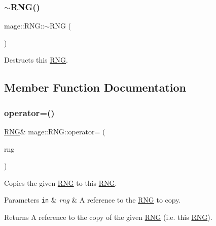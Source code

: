 \subsubsection{\texorpdfstring{$\sim$\+R\+N\+G()}{~RNG()}}
{\footnotesize\ttfamily mage\+::\+R\+N\+G\+::$\sim$\+R\+NG (\begin{DoxyParamCaption}{ }\end{DoxyParamCaption})\hspace{0.3cm}{\ttfamily [default]}}

Destructs this \mbox{\hyperlink{classmage_1_1_r_n_g}{R\+NG}}. 

\subsection{Member Function Documentation}
\mbox{\label{classmage_1_1_r_n_g_a38a0a4296338162fe105012cb4d13318}} 
\subsubsection{\texorpdfstring{operator=()}{operator=()}\hspace{0.1cm}{\footnotesize\ttfamily [1/2]}}
{\footnotesize\ttfamily \mbox{\hyperlink{classmage_1_1_r_n_g}{R\+NG}}\& mage\+::\+R\+N\+G\+::operator= (\begin{DoxyParamCaption}\item[{const \mbox{\hyperlink{classmage_1_1_r_n_g}{R\+NG}} \&}]{rng }\end{DoxyParamCaption})\hspace{0.3cm}{\ttfamily [delete]}}

Copies the given \mbox{\hyperlink{classmage_1_1_r_n_g}{R\+NG}} to this \mbox{\hyperlink{classmage_1_1_r_n_g}{R\+NG}}.


\begin{DoxyParams}[1]{Parameters}
\mbox{\tt in}  & {\em rng} & A reference to the \mbox{\hyperlink{classmage_1_1_r_n_g}{R\+NG}} to copy. \\
\hline
\end{DoxyParams}
\begin{DoxyReturn}{Returns}
A reference to the copy of the given \mbox{\hyperlink{classmage_1_1_r_n_g}{R\+NG}} (i.\+e. this \mbox{\hyperlink{classmage_1_1_r_n_g}{R\+NG}}). 
\end{DoxyReturn}
\mbox{\label{classmage_1_1_r_n_g_ac9155db13a3d4b7f44a4f800085197a2}} 
